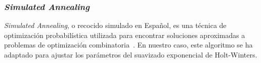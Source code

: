 \subsubsection{\textit{Simulated Annealing}}
\textit{Simulated Annealing}, o recocido simulado en Español, es una técnica de optimización probabilística utilizada para encontrar soluciones aproximadas a problemas de optimización combinatoria~\cite{kirkpatrick1983optimization}.
En nuestro caso, este algoritmo se ha adaptado para ajustar los parámetros del suavizado exponencial de Holt-Winters.